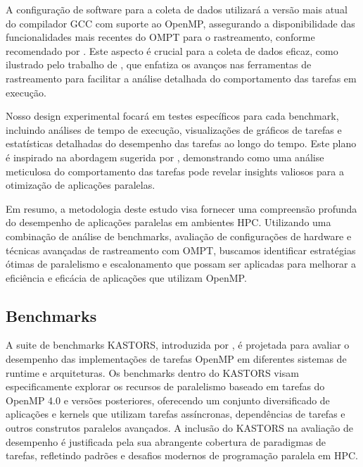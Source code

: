 \documentclass[ppgc,diss]{iiufrgs}
\begin{document}
A configuração de software para a coleta de dados utilizará a versão mais atual do compilador GCC com suporte ao OpenMP, assegurando a disponibilidade das funcionalidades mais recentes do OMPT para o rastreamento, conforme recomendado por \citet{Dagum1998OpenMP}. Este aspecto é crucial para a coleta de dados eficaz, como ilustrado pelo trabalho de \citet{Geimer2010SCALASCA}, que enfatiza os avanços nas ferramentas de rastreamento para facilitar a análise detalhada do comportamento das tarefas em execução.

Nosso design experimental focará em testes específicos para cada benchmark, incluindo análises de tempo de execução, visualizações de gráficos de tarefas e estatísticas detalhadas do desempenho das tarefas ao longo do tempo. Este plano é inspirado na abordagem sugerida por \citet{Chapman2007UsingOpenMP}, demonstrando como uma análise meticulosa do comportamento das tarefas pode revelar insights valiosos para a otimização de aplicações paralelas.


Em resumo, a metodologia deste estudo visa fornecer uma compreensão profunda do desempenho de aplicações paralelas em ambientes HPC. Utilizando uma combinação de análise de benchmarks, avaliação de configurações de hardware e técnicas avançadas de rastreamento com OMPT, buscamos identificar estratégias ótimas de paralelismo e escalonamento que possam ser aplicadas para melhorar a eficiência e eficácia de aplicações que utilizam OpenMP.

\subsection{Benchmarks}

A suite de benchmarks KASTORS, introduzida por , é projetada para avaliar o desempenho das implementações de tarefas OpenMP em diferentes sistemas de runtime e arquiteturas. Os benchmarks dentro do KASTORS visam especificamente explorar os recursos de paralelismo baseado em tarefas do OpenMP 4.0 e versões posteriores, oferecendo um conjunto diversificado de aplicações e kernels que utilizam tarefas assíncronas, dependências de tarefas e outros construtos paralelos avançados. A inclusão do KASTORS na avaliação de desempenho é justificada pela sua abrangente cobertura de paradigmas de tarefas, refletindo padrões e desafios modernos de programação paralela em HPC.
\end{document}
